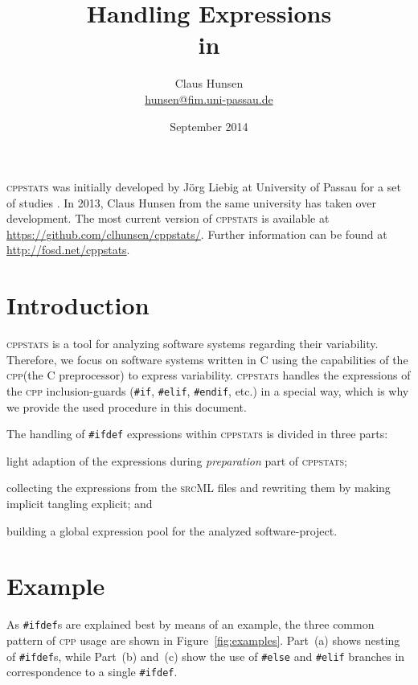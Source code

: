 \documentclass[a4paper]{scrartcl}
\title{Handling \ifdef Expressions\\in \cppstats}
\author{Claus Hunsen\\\url{hunsen@fim.uni-passau.de}}
\date{September 2014}
\newcommand\code[1]{\texttt{#1}}
\newcommand\tool[1]{\textsc{#1}}
\newcommand\ifdeff[1]{\code{\##1}\xspace}
\newcommand\ifdef[0]{{\upshape\ifdeff{ifdef}}\xspace}
\newcommand\ifdefs[0]{\ifdef{}s\xspace}
\newcommand\cppstats[0]{\tool{cppstats}\xspace}
\newcommand\cpp{\tool{cpp}\xspace}
\begin{document}
\maketitle


\begin{footnotesize}
\noindent \cppstats was initially developed by J\"org Liebig at University of Passau for a set of studies \cite{LiebigALKS10,LiebigKA11}.
In 2013, Claus Hunsen from the same university has taken over development.
The most current version of \cppstats is available at \url{https://github.com/clhunsen/cppstats/}.
Further information can be found at \url{http://fosd.net/cppstats}.
\end{footnotesize}

\section{Introduction}
\cppstats is a tool for analyzing software systems regarding their variability.
Therefore, we focus on software systems written in \tool{C} using the capabilities of the \cpp (the \tool{C} preprocessor) to express variability.
\cppstats handles the expressions of the \cpp inclusion-guards (\ifdeff{if}, \ifdeff{elif}, \ifdeff{endif}, etc.) in a special way, which is why we provide the used procedure in this document.

The handling of \ifdef expressions within \cppstats is divided in three parts:
\begin{inparaenum}[\itshape 1\upshape)]
\item light adaption of the expressions during \textit{preparation} part of \cppstats;
\item collecting the expressions from the \tool{srcML} files and rewriting them by making implicit tangling explicit; and
\item building a global expression pool for the analyzed software-project.
\end{inparaenum}


\section{Example}

As \ifdefs are explained best by means of an example, the three common pattern of \cpp usage are shown in Figure~\ref{fig:examples}.
Part~(a) shows nesting of \ifdefs, while Part~(b) and~(c) show the use of \ifdeff{else} and \ifdeff{elif} branches in correspondence to a single \ifdef.
\end{document}

